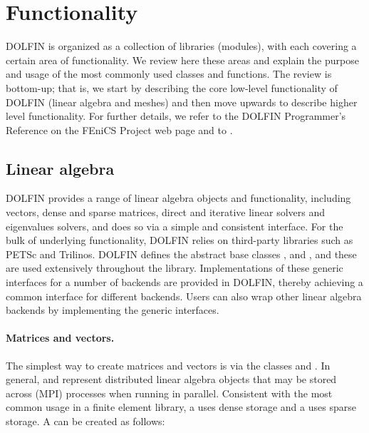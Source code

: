 \section{Functionality}
\label{sec:logg-2:functionality}

DOLFIN is organized as a collection of libraries (modules), with each
covering a certain area of functionality. We review here these areas
and explain the purpose and usage of the most commonly used classes and
functions. The review is bottom-up; that is, we start by describing the
core low-level functionality of DOLFIN (linear algebra and meshes) and
then move upwards to describe higher level functionality. For further
details, we refer to the DOLFIN Programmer's Reference on the FEniCS
Project web page and to \citet{LoggWells2010}.

\subsection{Linear algebra}

DOLFIN provides a range of linear algebra objects and functionality,
including vectors, dense and sparse matrices, direct and iterative linear
solvers and eigenvalues solvers, and does so via a simple and consistent
interface.  For the bulk of underlying functionality, DOLFIN relies
on third-party libraries such as PETSc and Trilinos.  DOLFIN defines
the abstract base classes , 
and , and these are used extensively throughout the
library.  Implementations of these generic interfaces for a number of
backends are provided in DOLFIN, thereby achieving a common interface for
different backends.  Users can also wrap other linear algebra backends
by implementing the generic interfaces.

\paragraph{Matrices and vectors.}

The simplest way to create matrices and vectors is via the classes
 and . In general,  and 
represent distributed linear algebra objects that may be stored across
(MPI) processes when running in parallel. Consistent with the most common
usage in a finite element library, a  uses dense storage
and a  uses sparse storage.  A  can be created
as follows:

